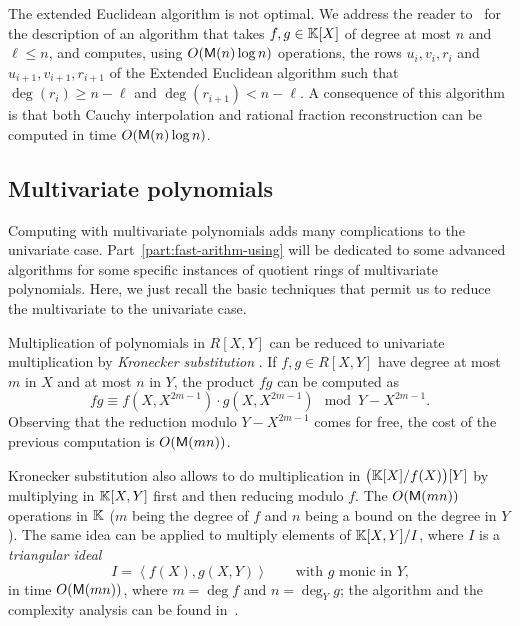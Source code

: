 The extended Euclidean algorithm is not optimal. We address the reader
to~\cite[$\S$11.1]{vzGG} for the description of an algorithm that
takes $f,g\in\mathbb{K}[X]$ of degree at most $n$ and $\ell\le n$, and
computes, using $O(\mathsf{M}(n)\log n)$ operations, the rows $u_i,v_i,r_i$
and $u_{i+1},v_{i+1},r_{i+1}$ of the Extended Euclidean algorithm such
that $\deg(r_i)\ge n-\ell$ and $\deg(r_{i+1})<n-\ell$. A consequence
of this algorithm is that both Cauchy interpolation and rational
fraction reconstruction can be computed in time $O(\mathsf{M}(n)\log n)$.



\subsection{Multivariate polynomials}
\label{sec:mult-polyn}
Computing with multivariate polynomials adds many complications to the
univariate case. Part~\ref{part:fast-arithm-using} will be dedicated
to some advanced algorithms for some specific instances of quotient
rings of multivariate polynomials. Here, we just recall the basic
techniques that permit us to reduce the multivariate to the univariate
case.

Multiplication of polynomials in $R[X,Y]$ can be reduced to univariate
multiplication by \textit{Kronecker
  substitution} \cite{vzGG,vzgathen+shoup92,harvey09}. If $f,g\in
R[X,Y]$ have degree at most $m$ in $X$ and at most $n$ in $Y$, the
product $fg$ can be computed as
\begin{equation}
  \label{eq:222}
  fg \equiv f(X,X^{2m-1})\cdot g(X,X^{2m-1}) \mod Y-X^{2m-1}
  \text{.}
\end{equation}
Observing that the reduction modulo $Y-X^{2m-1}$ comes for free, the
cost of the previous computation is $O(\mathsf{M}(mn))$.

Kronecker substitution also allows to do multiplication in
$\bigl(\mathbb{K}[X]/f(X)\bigr)[Y]$ by multiplying in $\mathbb{K}[X,Y]$ first and then
reducing modulo $f$. The $O(\mathsf{M}(mn))$ operations in $\mathbb{K}$ ($m$ being
the degree of $f$ and $n$ being a bound on the degree in $Y$). The
same idea can be applied to multiply elements of $\mathbb{K}[X,Y]/I$, where $I$
is a \emph{triangular ideal}
\begin{equation}
  \label{eq:228}
  I = \left\langle f(X), g(X,Y)\right\rangle
  \qquad\text{with $g$ monic in $Y$,}
\end{equation}
in time $O(\mathsf{M}(mn))$, where $m=\deg f$ and $n=\deg_Y g$; the
algorithm and the complexity analysis can be found
in~\cite[Proposition~4]{pascal+schost06}.

